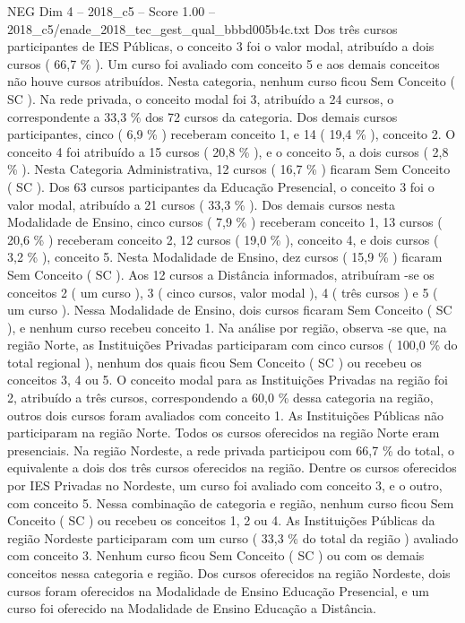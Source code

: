 \begin{textsample}{NEG Dim 4 – 2018\_c5 – Score 1.00 – 2018\_c5/enade\_2018\_tec\_gest\_qual\_bbbd005b4c.txt}
Dos três cursos participantes de IES Públicas, o conceito 3 foi o valor modal, atribuído a dois cursos ( 66,7 \% ).
Um curso foi avaliado com conceito 5 e aos demais conceitos não houve cursos atribuídos.
Nesta categoria, nenhum curso ficou Sem Conceito ( SC ).
Na rede privada, o conceito modal foi 3, atribuído a 24 cursos, o correspondente a 33,3 \% dos 72 cursos da categoria.
Dos demais cursos participantes, cinco ( 6,9 \% ) receberam conceito 1, e 14 ( 19,4 \% ), conceito 2.
O conceito 4 foi atribuído a 15 cursos ( 20,8 \% ), e o conceito 5, a dois cursos ( 2,8 \% ).
Nesta Categoria Administrativa, 12 cursos ( 16,7 \% ) ficaram Sem Conceito ( SC ).
Dos 63 cursos participantes da Educação Presencial, o conceito 3 foi o valor modal, atribuído a 21 cursos ( 33,3 \% ).
Dos demais cursos nesta Modalidade de Ensino, cinco cursos ( 7,9 \% ) receberam conceito 1, 13 cursos ( 20,6 \% ) receberam conceito 2, 12 cursos ( 19,0 \% ), conceito 4, e dois cursos ( 3,2 \% ), conceito 5.
Nesta Modalidade de Ensino, dez cursos ( 15,9 \% ) ficaram Sem Conceito ( SC ).
Aos 12 cursos a Distância informados, atribuíram -se os conceitos 2 ( um curso ), 3 ( cinco cursos, valor modal ), 4 ( três cursos ) e 5 ( um curso ).
Nessa Modalidade de Ensino, dois cursos ficaram Sem Conceito ( SC ), e nenhum curso recebeu conceito 1.
Na análise por região, observa -se que, na região Norte, as Instituições Privadas participaram com cinco cursos ( 100,0 \% do total regional ), nenhum dos quais ficou Sem Conceito ( SC ) ou recebeu os conceitos 3, 4 ou 5.
O conceito modal para as Instituições Privadas na região foi 2, atribuído a três cursos, correspondendo a 60,0 \% dessa categoria na região, outros dois cursos foram avaliados com conceito 1.
As Instituições Públicas não participaram na região Norte.
Todos os cursos oferecidos na região Norte eram presenciais.
Na região Nordeste, a rede privada participou com 66,7 \% do total, o equivalente a dois dos três cursos oferecidos na região.
Dentre os cursos oferecidos por IES Privadas no Nordeste, um curso foi avaliado com conceito 3, e o outro, com conceito 5.
Nessa combinação de categoria e região, nenhum curso ficou Sem Conceito ( SC ) ou recebeu os conceitos 1, 2 ou 4.
As Instituições Públicas da região Nordeste participaram com um curso ( 33,3 \% do total da região ) avaliado com conceito 3.
Nenhum curso ficou Sem Conceito ( SC ) ou com os demais conceitos nessa categoria e região.
Dos cursos oferecidos na região Nordeste, dois cursos foram oferecidos na Modalidade de Ensino Educação Presencial, e um curso foi oferecido na Modalidade de Ensino Educação a Distância.

\end{textsample}
